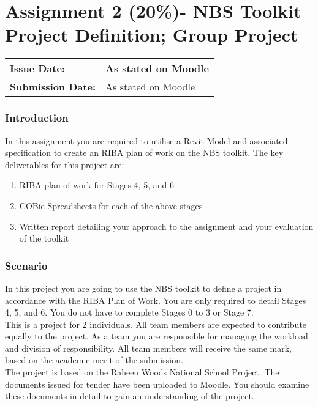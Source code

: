 
	

\part*{Assignment 2 (20\%)- NBS Toolkit Project Definition; Group Project}


\begin{tabularx}{\textwidth}{ |X|X| }
	\hline
	\textbf{Issue Date:} & As stated on Moodle \\
	\hline 
	\textbf{Submission Date:}  & As stated on Moodle  \\
	\hline
\end{tabularx}

\section*{Introduction}

In this assignment you are required to utilise a Revit Model and associated specification to create an RIBA plan of work on the NBS toolkit.  The key deliverables for this project are:

\begin{enumerate}
	\item RIBA plan of work for Stages 4, 5, and 6 
	\item COBie Spreadsheets for each of the above stages
	\item Written report detailing your approach to the assignment and your evaluation of the toolkit
\end{enumerate}

\section*{Scenario}



In this project you are going to use the NBS toolkit to define a project in accordance with the RIBA Plan of Work. You are only required to detail Stages 4, 5, and 6. You do not have to complete Stages 0 to 3 or Stage 7.\\


This is a project for 2 individuals. All team members are expected to contribute equally to the project. As a team you are responsible for managing the workload and division of responsibility. All team members will receive the same mark, based on the academic merit of the submission.\\


The project is based on the Raheen Woods National School Project. The documents issued for tender have been uploaded to Moodle. You should examine these documents in detail to gain an understanding of the project.\\


